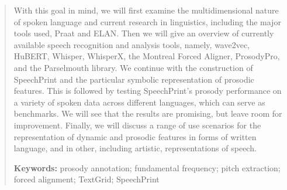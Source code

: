\begin{abstract}
With this goal in mind, we will first examine the multidimensional nature of spoken language and current research in linguistics, including the major tools used, Praat and ELAN. Then we will give an overview of currently available speech recognition and analysis tools, namely, wave2vec, HuBERT, Whisper, WhisperX, the Montreal Forced Aligner, ProsodyPro, and the Parselmouth library. We continue with the construction of SpeechPrint and the particular symbolic representation of prosodic features. This is followed by testing SpeechPrint's prosody performance on a variety of spoken data across different languages, which can serve as benchmarks. We will see that the results are promising, but leave room for improvement. Finally, we will discuss a range of use scenarios for the representation of dynamic and prosodic features in forms of written language, and in other, including artistic, representations of speech. 

\bigskip
\noindent\textbf{Keywords:} prosody annotation; fundamental frequency; pitch extraction; forced alignment; TextGrid; SpeechPrint





\end{abstract}
